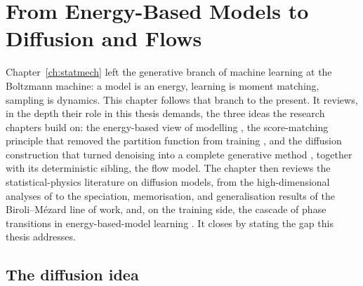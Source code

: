 \chapter{From Energy-Based Models to Diffusion and Flows}
\label{ch:diffusion}\label{ch:ebm}

Chapter~\ref{ch:statmech} left the generative branch of machine learning
at the Boltzmann machine: a model is an energy, learning is moment
matching, sampling is dynamics. This chapter follows that branch to the
present. It reviews, in the depth their role in this thesis demands, the
three ideas the research chapters build on: the energy-based view of
modelling \citep{lecun2006tutorial}, the score-matching principle that
removed the partition function from training
\citep{hyvarinen2005estimation, vincent2011connection}, and the diffusion
construction that turned denoising into a complete generative method
\citep{sohl2015deep, ho2020denoising, song2021scorebased}, together with
its deterministic sibling, the flow model. The chapter then reviews the
statistical-physics literature on diffusion models, from the
high-dimensional analyses of \citet{biroli2023generative} to the
speciation, memorisation, and generalisation results of the
Biroli--M\'ezard line of work, and, on the training side, the cascade of
phase transitions in energy-based-model learning
\citep{bachtis2024cascade}. It closes by stating the gap this thesis
addresses.

\section{The diffusion idea}\label{sec:diffusion-idea}

